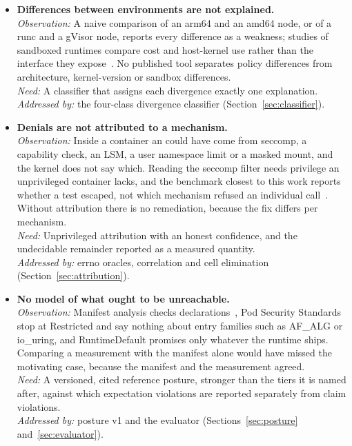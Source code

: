 \begin{itemize}[leftmargin=*,itemsep=5pt]
\item \textbf{Differences between environments are not explained.}\\
\textit{Observation:} A naive comparison of an arm64 and an amd64 node, or of a runc and a gVisor node, reports every difference as a weakness; studies of sandboxed runtimes compare cost and host-kernel use rather than the interface they expose~\cite{young2019gvisor,anjali2020blending}. No published tool separates policy differences from architecture, kernel-version or sandbox differences.\\
\textit{Need:} A classifier that assigns each divergence exactly one explanation.\\
\textit{Addressed by:} the four-class divergence classifier (Section~\ref{sec:classifier}).

\item \textbf{Denials are not attributed to a mechanism.}\\
\textit{Observation:} Inside a container an  could have come from seccomp, a capability check, an LSM, a user namespace limit or a masked mount, and the kernel does not say which. Reading the seccomp filter needs privilege an unprivileged container lacks, and the benchmark closest to this work reports whether a test escaped, not which mechanism refused an individual call~\cite{houdini}. Without attribution there is no remediation, because the fix differs per mechanism.\\
\textit{Need:} Unprivileged attribution with an honest confidence, and the undecidable remainder reported as a measured quantity.\\
\textit{Addressed by:} errno oracles, correlation and cell elimination (Section~\ref{sec:attribution}).

\item \textbf{No model of what ought to be unreachable.}\\
\textit{Observation:} Manifest analysis checks declarations~\cite{rahman2023}, Pod Security Standards~\cite{pss} stop at Restricted and say nothing about entry families such as AF\_ALG or io\_uring, and RuntimeDefault promises only whatever the runtime ships. Comparing a measurement with the manifest alone would have missed the motivating case, because the manifest and the measurement agreed.\\
\textit{Need:} A versioned, cited reference posture, stronger than the tiers it is named after, against which expectation violations are reported separately from claim violations.\\
\textit{Addressed by:} posture v1 and the evaluator (Sections~\ref{sec:posture} and~\ref{sec:evaluator}).


\end{itemize}
